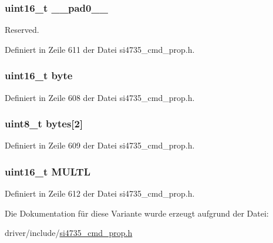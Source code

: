 \subsubsection[{\+\_\+\+\_\+pad0\+\_\+\+\_\+}]{\setlength{\rightskip}{0pt plus 5cm}uint16\+\_\+t \+\_\+\+\_\+pad0\+\_\+\+\_\+}\label{unionfm__rsq__multi__lo__thres_a77132c2c26a75f5b8751b235cda23828}


Reserved. 



Definiert in Zeile 611 der Datei si4735\+\_\+cmd\+\_\+prop.\+h.

\hypertarget{unionfm__rsq__multi__lo__thres_ab0549c1b5ea980a02e7eab77e21fea49}{}
\subsubsection[{byte}]{\setlength{\rightskip}{0pt plus 5cm}uint16\+\_\+t byte}\label{unionfm__rsq__multi__lo__thres_ab0549c1b5ea980a02e7eab77e21fea49}


Definiert in Zeile 608 der Datei si4735\+\_\+cmd\+\_\+prop.\+h.

\hypertarget{unionfm__rsq__multi__lo__thres_a46e4c05d20a047ec169f60d3167e912e}{}
\subsubsection[{bytes}]{\setlength{\rightskip}{0pt plus 5cm}uint8\+\_\+t bytes\mbox{[}2\mbox{]}}\label{unionfm__rsq__multi__lo__thres_a46e4c05d20a047ec169f60d3167e912e}


Definiert in Zeile 609 der Datei si4735\+\_\+cmd\+\_\+prop.\+h.

\hypertarget{unionfm__rsq__multi__lo__thres_aedafc0a3e30016fbf04b9fee188567c8}{}
\subsubsection[{M\+U\+L\+T\+L}]{\setlength{\rightskip}{0pt plus 5cm}uint16\+\_\+t M\+U\+L\+T\+L}\label{unionfm__rsq__multi__lo__thres_aedafc0a3e30016fbf04b9fee188567c8}


Definiert in Zeile 612 der Datei si4735\+\_\+cmd\+\_\+prop.\+h.



Die Dokumentation für diese Variante wurde erzeugt aufgrund der Datei\+:\begin{DoxyCompactItemize}
\item 
driver/include/\hyperlink{si4735__cmd__prop_8h}{si4735\+\_\+cmd\+\_\+prop.\+h}\end{DoxyCompactItemize}
